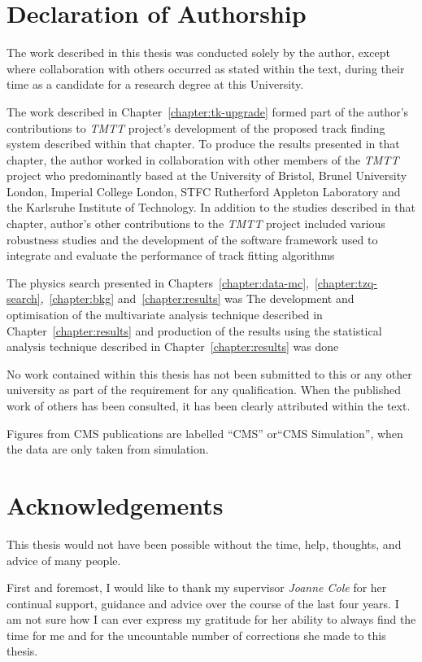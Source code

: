 \documentclass[11pt,a4paper]{report}
\begin{document}
\chapter*{Declaration of Authorship} \label{sec:declaration}
The work described in this thesis was conducted solely by the author, except where collaboration with others occurred as stated within the text, during their time as a candidate for a research degree at this University.

The work described in Chapter~\ref{chapter:tk-upgrade} formed part of the author's contributions to \emph{TMTT} project's development of the proposed track finding system described within that chapter.
To produce the results presented in that chapter, the author worked in collaboration with other members of the \emph{TMTT} project who predominantly based at the University of Bristol, Brunel University London, Imperial College London, STFC Rutherford Appleton Laboratory and the Karlsruhe Institute of Technology.
In addition to the studies described in that chapter, author's other contributions to the \emph{TMTT} project included various robustness studies and the development of the software framework used to integrate and evaluate the performance of track fitting algorithms

The physics search presented in Chapters~\ref{chapter:data-mc},~\ref{chapter:tzq-search},~\ref{chapter:bkg} and~\ref{chapter:results} was 
The development and optimisation of the multivariate analysis technique described in Chapter~\ref{chapter:results} and production of the results using the statistical analysis technique described in Chapter~\ref{chapter:results} was done

No work contained within this thesis has not been submitted to this or any other university as part of the requirement for any qualification.
When the published work of others has been consulted, it has been clearly attributed within the text.

Figures from CMS publications are labelled ``CMS'' or``CMS Simulation'', when the data are only taken from simulation.

\clearpage
\newpage

\chapter*{Acknowledgements} \label{sec:acknowledgments}
This thesis would not have been possible without the time, help, thoughts, and advice of many people.

First and foremost, I would like to thank my supervisor \textit{Joanne Cole} for her continual support, guidance and advice over the course of the last four years.
I am not sure how I can ever express my gratitude for her ability to always find the time for me and for the uncountable number of corrections she made to this thesis.
\end{document}
